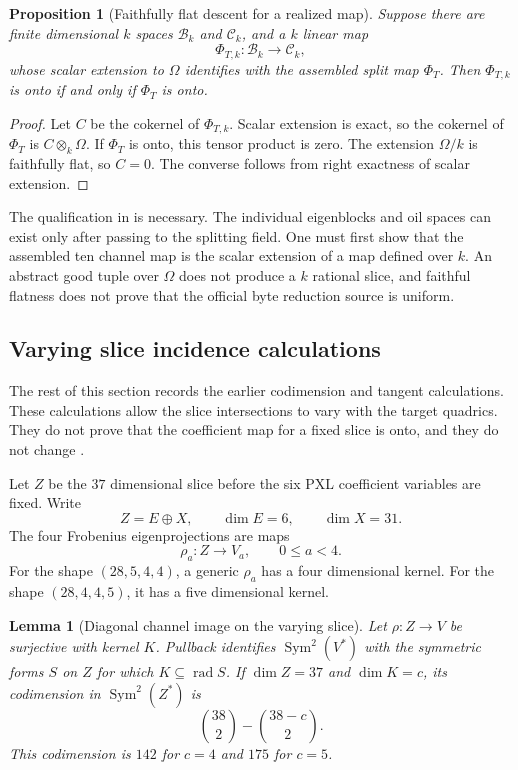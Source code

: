 \documentclass[11pt]{article}
\newcommand{\Sym}{\operatorname{Sym}}
\newcommand{\rad}{\operatorname{rad}}
\theoremstyle{plain}
\newtheorem{proposition}[theorem]{Proposition}
\newtheorem{lemma}[theorem]{Lemma}
\theoremstyle{definition}
\theoremstyle{remark}
\begin{document}
\begin{proposition}[Faithfully flat descent for a realized map]
\label{prop:l4-descent}
Suppose there are finite dimensional $k$ spaces $\mathcal B_k$ and
$\mathcal C_k$, and a $k$ linear map
\[
 \Phi_{T,k}:\mathcal B_k\longrightarrow\mathcal C_k,
\]
whose scalar extension to $\Omega$ identifies with the assembled split map
$\Phi_T$.  Then $\Phi_{T,k}$ is onto if and only if $\Phi_T$ is onto.
\end{proposition}

\begin{proof}
Let $C$ be the cokernel of $\Phi_{T,k}$.  Scalar extension is exact, so the
cokernel of $\Phi_T$ is $C\otimes_k\Omega$.  If $\Phi_T$ is onto, this tensor
product is zero.  The extension $\Omega/k$ is faithfully flat, so $C=0$.
The converse follows from right exactness of scalar extension.
\end{proof}

The qualification in  is necessary.  The individual
eigenblocks and oil spaces can exist only after passing to the splitting
field.  One must first show that the assembled ten channel map is the scalar
extension of a map defined over $k$.  An abstract good tuple over $\Omega$
does not produce a $k$ rational slice, and faithful flatness does not prove
that the official byte reduction source is uniform.

\subsection{Varying slice incidence calculations}
\label{sec:l4-varying-slice}

The rest of this section records the earlier codimension and tangent
calculations.  These calculations allow the slice intersections to vary with
the target quadrics.  They do not prove that the coefficient map for a fixed
slice is onto, and they do not change
.

Let $Z$ be the $37$ dimensional slice before the six PXL coefficient
variables are fixed.  Write
\[
  Z=E\oplus X,
  \qquad \dim E=6,
  \qquad \dim X=31.
\]
The four Frobenius eigenprojections are maps
\[
  \rho_a:Z\longrightarrow V_a,
  \qquad 0\leq a<4.
\]
For the shape $(28,5,4,4)$, a generic $\rho_a$ has a four dimensional
kernel.  For the shape $(28,4,4,5)$, it has a five dimensional kernel.

\begin{lemma}[Diagonal channel image on the varying slice]
\label{lem:l4-diagonal-kernel}
Let $\rho:Z\to V$ be surjective with kernel $K$.  Pullback identifies
$\Sym^2(V^*)$ with the symmetric forms $S$ on $Z$ for which
$K\subseteq\rad S$.  If $\dim Z=37$ and $\dim K=c$, its codimension in
$\Sym^2(Z^*)$ is
\[
  \binom{38}{2}-\binom{38-c}{2}.
\]
This codimension is $142$ for $c=4$ and $175$ for $c=5$.
\end{lemma}
\end{document}
